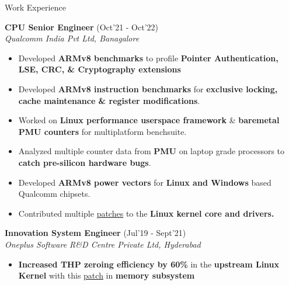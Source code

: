 \begin{rSection}{Work Experience}

\vspace{-.4cm}
 
\item{\bf {\bf CPU Senior Engineer}}     \hfill{(Oct'21 - Oct'22)}\\
\emph{Qualcomm India Pvt Ltd, Banagalore}\\
\vspace{-.01cm}

\begin{itemize}[leftmargin=*]

	\itemsep \sepval
	
	\item Developed {\bf ARMv8 benchmarks} to profile {\bf Pointer Authentication, LSE, CRC, \& Cryptography extensions}

	\item Developed {\bf ARMv8 instruction benchmarks} for {\bf exclusive locking, cache maintenance \& register modifications}.

	\item Worked on {\bf Linux performance userspace framework} \& {\bf baremetal PMU counters} for multiplatform benchsuite.

	\item Analyzed multiple counter data from {\bf PMU} on laptop grade processors to {\bf catch pre-silicon hardware bugs}.

	\item Developed {\bf ARMv8 power vectors} for {\bf Linux and Windows} based Qualcomm chipsets.

	\item Contributed multiple \href{https://lore.kernel.org/all/?q=prathu+baronia}{patches} to the \bf{Linux kernel core and drivers}.
	
\end{itemize}
\vspace{-.2cm}

\item{\bf {\bf Innovation System Engineer}}  \hfill{(Jul'19 - Sept'21)}\\
\emph{Oneplus Software R\&D Centre Private Ltd, Hyderabad}\\
\vspace{-.01cm}

\begin{itemize}[leftmargin=*]

	\itemsep \sepval

	\item {\bf Increased THP zeroing efficiency by 60\%} in the {\bf upstream
		Linux Kernel} with this
		\href{https://git.kernel.org/pub/scm/linux/kernel/git/torvalds/linux.git/commit/?id=d2c20e51e3966bc668ef1ef21fbe90704286c8d0}{patch}
		in {\bf memory subsystem}


\end{itemize}
\end{rSection}
